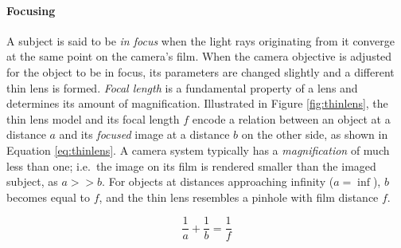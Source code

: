 


\paragraph{Focusing}
A subject is said to be \emph{in focus} when the light rays originating from it converge at the same point on the camera's film.
When the camera objective is adjusted for the object to be in focus, its parameters are changed slightly and a different thin lens is formed.
\emph{Focal length} is a fundamental property of a lens and determines its amount of magnification.
Illustrated in Figure \ref{fig:thinlens}, the thin lens model and its focal length $f$ encode a relation between an object at a distance $a$ and its \emph{focused} image at a distance $b$ on the other side, as shown in Equation \ref{eq:thinlens}.
A camera system typically has a \emph{magnification} of much less than one; i.e.\ the image on its film is rendered smaller than the imaged subject, as $a >> b$.
For objects at distances approaching infinity ($a = \inf$), $b$ becomes equal to $f$, and the thin lens resembles a pinhole with film distance $f$. \cite{szeliski10vision}

\begin{equation} \label{eq:thinlens}
	\frac{1}{a} + \frac{1}{b} = \frac{1}{f}
\end{equation}




